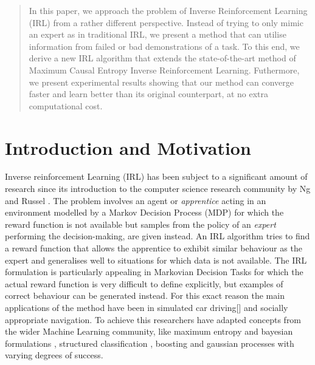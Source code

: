 \documentclass[conference]{IEEEtran}
\begin{document}
\begin{abstract}
In this paper, we approach the problem of Inverse Reinforcement Learning (IRL) from a rather different perspective. Instead of trying to only mimic an expert as in 
traditional IRL, we present a method that can utilise information from failed or bad demonstrations of a task. To this end, we derive a new IRL algorithm that extends the state-of-the-art method of Maximum Causal Entropy Inverse Reinforcement Learning.  Futhermore, we present experimental results showing that our method can converge faster and learn better than its original counterpart, at no extra computational cost. 
\end{abstract}

\IEEEpeerreviewmaketitle

\section{Introduction and Motivation}
Inverse reinforcement Learning (IRL) has been subject to a significant amount of research since its introduction to the computer science research community by Ng and Russel \cite{ng2000algorithms}. The problem involves an agent or \emph{apprentice} acting in an environment modelled by a Markov Decision Process (MDP) for which the reward function is not available but samples from the policy of an \emph{expert} performing the decision-making, are given instead. An IRL algorithm tries to find a reward function that allows the apprentice to exhibit similar behaviour as the expert and generalises well to situations for which data is not available. The IRL formulation is particularly appealing in Markovian Decision Tasks for which the actual reward function is very difficult to define explicitly, but examples of correct behaviour can be generated instead. For this exact reason the main applications of the method have been in simulated car driving[] and socially appropriate navigation\cite{henry2010learning}\cite{vasquez2014inverse}. To achieve this researchers have  adapted concepts from the wider Machine Learning community, like maximum entropy\cite{ziebart2008maximum} and bayesian formulations \cite{ramachandran2007bayesian}, structured classification \cite{ratliff2006maximum}, boosting \cite{ratliff2007boosting} and gaussian processes\cite{levine2011nonlinear} with varying degrees of success.\\
\end{document}
